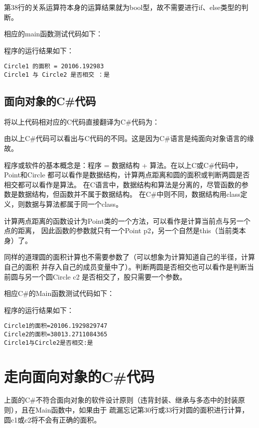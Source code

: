 第38行的关系运算符本身的运算结果就为bool型，故不需要进行if、else类型的判断。

相应的main函数测试代码如下：



程序的运行结果如下：
\begin{verbatim}
Circle1 的面积 = 20106.192983
Circle1 与 Circle2 是否相交 ：是
\end{verbatim}


\subsection{面向对象的C\#代码}

将以上代码相对应的C代码直接翻译为C\#代码为：



由以上C\#代码可以看出与C代码的不同。这是因为C\#语言是纯面向对象语言的缘故。

程序或软件的基本概念是：程序 = 数据结构 + 算法。在以上C或C\#代码中，Point和Circle
都可以看作是数据结构，计算两点距离和圆的面积或判断两圆是否相交都可以看作是算法。
在C语言中，数据结构和算法是分离的，尽管函数的参数是数据结构，但函数并不属于数据结构。
在C\#中则不同，数据结构用class定义，则数据与算法都属于同一个class。

计算两点距离的函数设计为Point类的一个方法，可以看作是计算当前点与另一个点的距离，
因此函数的参数就只有一个Point p2，另一个自然是this（当前类本身）了。

同样的道理圆的面积计算也不需要参数了（可以想象为计算知道自己的半径，计算自己的面积
并存入自己的成员变量中了）。判断两圆是否相交也可以看作是判断当前圆与另一个圆Circle c2
是否相交了，股只需要一个参数。

相应C\#的Main函数测试代码如下：



程序的运行结果如下：
\begin{verbatim}
Circle1的面积=20106.1929829747
Circle2的面积=38013.2711084365
Circle1与Circle2是否相交:是
\end{verbatim}

\section{走向面向对象的C\#代码}
上面的C\#不符合面向对象的软件设计原则（违背封装、继承与多态中的封装原则），且在Main函数中，如果由于
疏漏忘记第30行或33行对圆的面积进行计算，圆c1或c2将不会有正确的面积。

